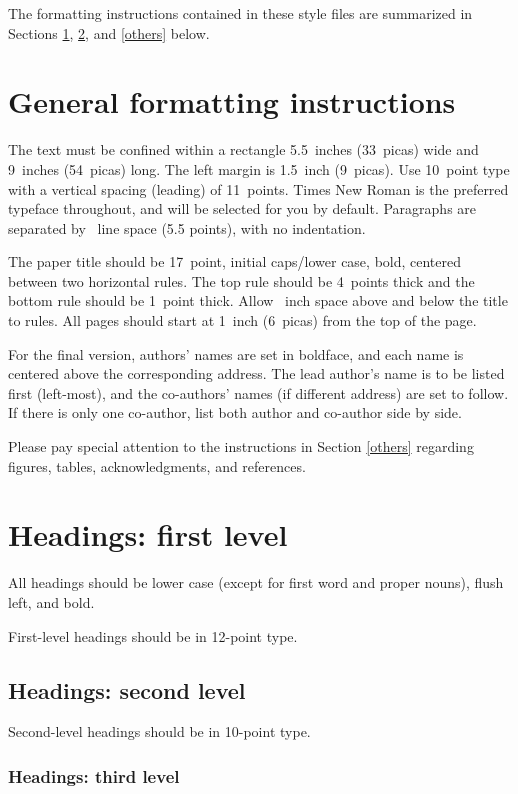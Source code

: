\documentclass{article}
\begin{document}
The formatting instructions contained in these style files are summarized in Sections \ref{gen_inst}, \ref{headings}, and \ref{others} below.


\section{General formatting instructions}
\label{gen_inst}


The text must be confined within a rectangle 5.5~inches (33~picas) wide and
9~inches (54~picas) long. The left margin is 1.5~inch (9~picas).  Use 10~point
type with a vertical spacing (leading) of 11~points.  Times New Roman is the
preferred typeface throughout, and will be selected for you by default.
Paragraphs are separated by ~line space (5.5 points), with no
indentation.


The paper title should be 17~point, initial caps/lower case, bold, centered
between two horizontal rules. The top rule should be 4~points thick and the
bottom rule should be 1~point thick. Allow ~inch space above and
below the title to rules. All pages should start at 1~inch (6~picas) from the
top of the page.


For the final version, authors' names are set in boldface, and each name is
centered above the corresponding address. The lead author's name is to be listed
first (left-most), and the co-authors' names (if different address) are set to
follow. If there is only one co-author, list both author and co-author side by
side.


Please pay special attention to the instructions in Section \ref{others}
regarding figures, tables, acknowledgments, and references.

\section{Headings: first level}
\label{headings}


All headings should be lower case (except for first word and proper nouns),
flush left, and bold.


First-level headings should be in 12-point type.


\subsection{Headings: second level}


Second-level headings should be in 10-point type.


\subsubsection{Headings: third level}
\end{document}
